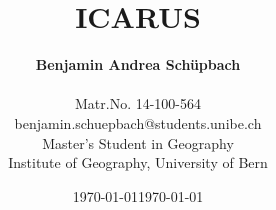 


	\author{\textbf{Benjamin Andrea Schüpbach}\\ \\Matr.No. 14-100-564\\benjamin.schuepbach@students.unibe.ch\\Master's Student in Geography\\Institute of Geography, University of Bern\\}
	
	\date{\today}
	
	\title{\textbf{ICARUS\\}}
	\date{\today}
	\maketitle

